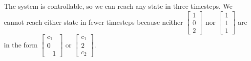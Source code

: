 {\begin{enumerate}
        \qitem
        The system is controllable, so we can reach any state in three timesteps.
        We cannot reach either state in fewer timesteps because neither $\begin{bmatrix} 1 \\ 0 \\ 2 \end{bmatrix}$ nor $\begin{bmatrix} 1 \\ 1 \\ 1 \end{bmatrix}$ are in the form $\begin{bmatrix} c_1 \\ 0 \\ -1 \end{bmatrix}$ or $\begin{bmatrix} c_1 \\ 2 \\ c_2 \end{bmatrix}$.

    \end{enumerate}
}
